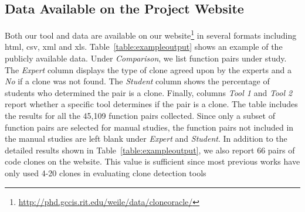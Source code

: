 \documentclass{sig-alternate}
\begin{document}
\subsection{Data Available on the Project Website}
Both our tool and data are available on our website\footnote{\url{http://phd.gccis.rit.edu/weile/data/cloneoracle/}} in several formats including html, csv, xml and xls. Table~\ref{table:exampleoutput} shows an example of the publicly available data. Under {\it Comparison}, we list function pairs under study. The {\it Expert} column displays the type of clone agreed upon by the experts and a {\it No} if a clone was not found. The {\it Student} column shows the percentage of students who determined the pair is a clone. Finally, columns {\it Tool 1} and {\it Tool 2} report whether a specific tool determines if the pair is a clone. The table includes the results for all the 45,109 function pairs collected. Since only a subset of function pairs are selected for manual studies, the function pairs  not included in the manual studies are left blank under {\it Expert} and {\it Student}.  In addition to the detailed results shown in Table~\ref{table:exampleoutput}, we also report 66 pairs of code clones on the website. This value is sufficient since most previous works have only used 4-20 clones in evaluating clone detection tools~\cite{Roy:2009:CEC:1530898.1531101,Kraw2012}



\begin{table}[thb!]
\begin{center}
\caption{Example Results Output}
\label{table:exampleoutput}
\end{center}

\end{table}
\end{document}
